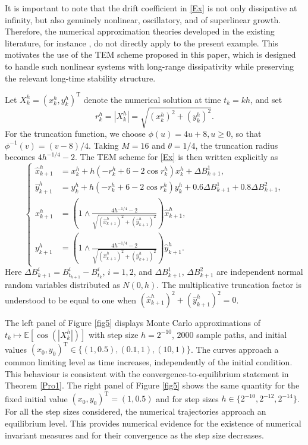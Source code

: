 \documentclass[aap]{imsart}
\theoremstyle{plain}
\theoremstyle{definition}
\begin{document}
			
			It is important to note that the drift coefficient in \eqref{Ex} is not only dissipative at infinity, but also genuinely nonlinear, oscillatory, and of superlinear growth. Therefore, the numerical approximation theories developed in the existing literature, for instance \cite{Bao, Bao1, Bao2, Majka, A.D. N}, do not directly apply to the present example. This motivates the use of the TEM scheme proposed in this paper, which is designed to handle such nonlinear systems with long-range dissipativity while preserving the relevant long-time stability structure.
					
Let \(X_k^h=(x_k^h,y_k^h)^{\mathrm T}\) denote the numerical solution at time $t_k=kh$, and set
\[
r_k^h=|X_k^h|
=
\sqrt{(x_k^h)^2+(y_k^h)^2}.
\]
For the truncation function, we choose \(\phi(u)=4u+8, u\geqslant 0\),
so that \(\phi^{-1}(v)=(v-8)/4\). Taking \(M=16\) and \(\theta=1/4\), the truncation radius becomes \(4h^{-1/4}-2\).
The TEM scheme for \eqref{Ex} is then written explicitly as
\[\left\{\begin{aligned}
	\widehat x_{k+1}^h
	&=
	x_k^h+h(-r_k^h+6-2\cos r_k^h)x_k^h
	+\Delta B_{k+1}^{1},\\
	\widehat y_{k+1}^h
	&=
	y_k^h+h(-r_k^h+6-2\cos r_k^h)y_k^h
	+0.6\Delta B_{k+1}^{1}
	+0.8\Delta B_{k+1}^{2},\\
	x_{k+1}^h
	&=
	\left(1\wedge \frac{4h^{-1/4}-2}{\sqrt{(\widehat x_{k+1}^h)^2+(\widehat y_{k+1}^h)^2}}\right)
	\widehat x_{k+1}^h,\\
	y_{k+1}^h
	&=
	\left(1\wedge \frac{4h^{-1/4}-2}{\sqrt{(\widehat x_{k+1}^h)^2+(\widehat y_{k+1}^h)^2}}\right)
	\widehat y_{k+1}^h.
\end{aligned}\right.\]
Here \(\Delta B_{k+1}^{i} =
B_{t_{k+1}}^i-B_{t_k}^i\), \(i=1,2\), and $\Delta B_{k+1}^{1}$, $\Delta B_{k+1}^{2}$ are independent normal random variables distributed as $N(0,h)$. The multiplicative truncation factor is understood to be equal to one when \((\widehat x_{k+1}^h)^2+(\widehat y_{k+1}^h)^2=0\).

The left panel of Figure \ref{fig5} displays Monte Carlo approximations of \(t_k\mapsto \mathbb{E}[\cos(|X_k^h|)]\)
with step size \(h=2^{-10}\), \(2000\) sample paths, and initial values \((x_0,y_0)^{\mathrm T}\in\{(1,0.5),(0.1,1),(10,1)\}\).
The curves approach a common limiting level as time increases, independently of the initial condition. This behaviour is consistent with the convergence-to-equilibrium statement in Theorem \ref{Pro1}. The right panel of Figure \ref{fig5} shows the same quantity for the fixed initial value \((x_0,y_0)^{\mathrm T}=(1,0.5)\) and for step sizes \(h\in\{2^{-10},2^{-12},2^{-14}\}\).
For all the step sizes considered, the numerical trajectories approach an equilibrium level. This provides numerical evidence for the existence of numerical invariant measures and for their convergence as the step size decreases.
			
\end{document}
